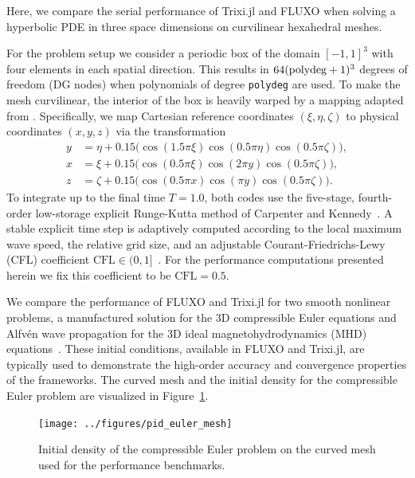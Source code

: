 \documentclass[hidelinks]{juliacon} %
\newcommand{\trixi}{Trixi.jl\xspace}
\begin{document}
Here, we compare the serial performance of \trixi and FLUXO when solving a
hyperbolic PDE in three space dimensions on curvilinear hexahedral meshes.

For the problem setup we consider a periodic box of the domain $[-1,1]^3$ with four elements in each
spatial direction. This results in $64 (\text{\lstinline{polydeg}}+1)^3$ degrees
of freedom (DG nodes) when polynomials of degree \lstinline{polydeg} are used.
To make the mesh curvilinear, the interior of the box is heavily warped by
a mapping adapted from \cite{chan2019efficient}.
Specifically, we map Cartesian reference coordinates $(\xi, \eta, \zeta)$ to
physical coordinates $(x, y, z)$ via the transformation
\begin{equation}
\begin{aligned}
  y &= \eta  + 0.15 \bigl( \cos(1.5 \pi \xi) \cos(0.5 \pi \eta) \cos(0.5 \pi \zeta) \bigr),
  \\
  x &= \xi   + 0.15 \bigl( \cos(0.5 \pi \xi) \cos(2 \pi y) \cos(0.5 \pi \zeta) \bigr),
  \\
  z &= \zeta + 0.15 \bigl( \cos(0.5 \pi x) \cos(\pi y) \cos(0.5 \pi \zeta) \bigr).
\end{aligned}
\end{equation}
To integrate up to the
final time $T=1.0$, both codes use the five-stage, fourth-order low-storage explicit
Runge-Kutta method of Carpenter and Kennedy~\cite{CarpenterKennedy1994}.
A stable explicit time step is adaptively computed according to the local maximum wave
speed, the relative grid size, and an adjustable Courant-Friedrichs-Lewy (CFL)
coefficient $\text{CFL}\in(0,1]$~\cite{gassner2011}. For the performance computations presented herein
we fix this coefficient to be $\text{CFL}=0.5$.

We compare the performance of FLUXO and \trixi for two smooth nonlinear problems,
a manufactured solution for the 3D compressible Euler equations and Alfv\'{e}n wave propagation for
the 3D ideal magnetohydrodynamics (MHD) equations~\cite{gassner2009,altmann2012}. These initial conditions, available in FLUXO and
\trixi, are typically used to demonstrate the high-order accuracy and convergence properties
of the frameworks.
The curved mesh and the initial density for the compressible Euler problem are
visualized in Figure~\ref{fig:pid_euler_mesh}.

\begin{figure}[!h]
  \texttt{[image: ../figures/pid\_euler\_mesh]}
  \caption{Initial density of the compressible Euler problem on the curved mesh
           used for the performance benchmarks.}
  \label{fig:pid_euler_mesh}
\end{figure}
\end{document}
